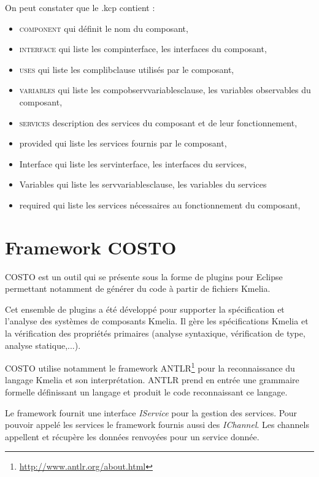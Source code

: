 On peut constater que le .kcp contient :
\begin{itemize}[label=\textbullet, font=\large]
    \item {\scshape component} qui définit le nom du composant,
    \item {\scshape interface} qui liste les compinterface, les interfaces du composant,
    \item {\scshape uses} qui liste les complibclause utilisés par le composant,
    \item {\scshape variables} qui liste les compobservvariablesclause, les variables observables du composant,
    \item {\scshape services} description des services du composant et de leur fonctionnement,
    \item provided qui liste les services fournis par le composant,
    \item Interface  qui liste les servinterface, les interfaces du services,
    \item Variables qui liste les servvariablesclause, les variables du services
    \item required qui liste les services nécessaires au fonctionnement du composant,
\end{itemize}

\clearpage
\section{Framework COSTO}
\label{chap:KmeliaOutilDeTestCOSTO}
    COSTO est un outil qui se présente sous la forme de plugins pour Eclipse permettant notamment de générer du code à partir de fichiers Kmelia.

    Cet ensemble de plugins a été développé pour supporter la spécification et l'analyse des systèmes de composants Kmelia. Il gère les spécifications Kmelia et la vérification des propriétés primaires (analyse syntaxique, vérification de type, analyse statique,...)\cite{rapportM2}.

    COSTO utilise notamment le framework ANTLR\footnote{\url{http://www.antlr.org/about.html}} pour la reconnaissance du langage Kmelia et son interprétation. ANTLR prend en entrée une grammaire formelle définissant un langage et produit le code reconnaissant ce langage.

    Le framework fournit une interface \textit{IService} pour la gestion des services. Pour pouvoir appelé les services le framework fournis aussi des \textit{IChannel}. Les channels appellent et récupère les données renvoyées pour un service donnée. 


